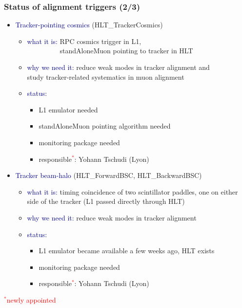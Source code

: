\documentclass[compress]{beamer}
\begin{document}
\begin{frame}
\frametitle{Status of alignment triggers (2/3)}
\begin{itemize}\setlength{\itemsep}{0.25 cm}
\item \textcolor{darkblue}{Tracker-pointing cosmics} {\scriptsize (HLT\_TrackerCosmics)}
\begin{itemize}
\item \textcolor{darkblue}{what it is:} RPC cosmics trigger in L1, \\ \textcolor{white}{what it is:} standAloneMuon pointing to tracker in HLT
\item \textcolor{darkblue}{why we need it:} reduce weak modes in tracker alignment and \\ \hfill study tracker-related systematics in muon alignment
\item \textcolor{darkblue}{status:}
\begin{itemize}
\item L1 emulator needed
\item standAloneMuon pointing algorithm needed
\item monitoring package needed
\item responsible\textcolor{red}{$^*$}: Yohann Tschudi (Lyon)
\end{itemize}
\end{itemize}

\item \textcolor{darkblue}{Tracker beam-halo} {\scriptsize (HLT\_ForwardBSC, HLT\_BackwardBSC)}
\begin{itemize}
\item \textcolor{darkblue}{what it is:} timing coincidence of two scintillator paddles, one on either side of the tracker (L1 passed directly through HLT)
\item \textcolor{darkblue}{why we need it:} reduce weak modes in tracker alignment
\item \textcolor{darkblue}{status:}
\begin{itemize}
\item L1 emulator became available a few weeks ago, HLT exists
\item monitoring package needed
\item responsible\textcolor{red}{$^*$}: Yohann Tschudi (Lyon)
\end{itemize}
\end{itemize}
\end{itemize}

\vspace{-0.5 cm}
\hfill \textcolor{red}{$^*$newly appointed}

\vspace{0.25 cm}
\end{frame}
\end{document}
